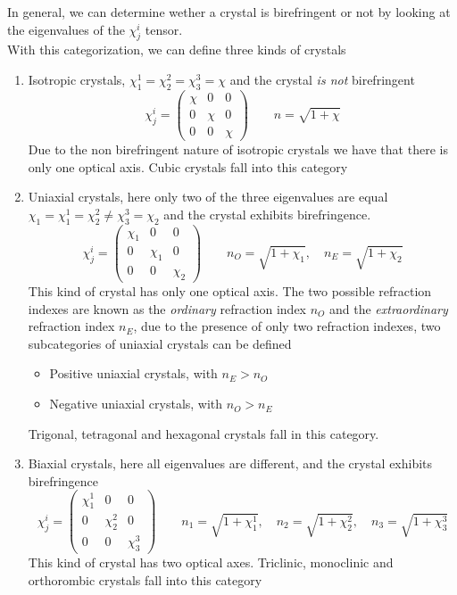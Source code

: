 \documentclass[../electromagnetism.tex]{subfiles}
\begin{document}
In general, we can determine wether a crystal is birefringent or not by looking at the eigenvalues of the $\chi^i_j$ tensor.\\
With this categorization, we can define three kinds of crystals
\begin{enumerate}
\item Isotropic crystals, $\chi^1_1=\chi^2_2=\chi^3_3=\chi$ and the crystal \textit{is not} birefringent
	\begin{equation}
		\chi^i_j=\begin{pmatrix}
			\chi&0&0\\
			0&\chi&0\\
			0&0&\chi
		\end{pmatrix}\qquad n=\sqrt{1+\chi}
		\label{eq:isotropic.cry}
	\end{equation}
	Due to the non birefringent nature of isotropic crystals we have that there is only one optical axis. Cubic crystals fall into this category
\item Uniaxial crystals, here only two of the three eigenvalues are equal $\chi_1=\chi^1_1=\chi^2_2\ne\chi^3_3=\chi_2$ and the crystal exhibits birefringence.
	\begin{equation}
		\chi^i_j=\begin{pmatrix}
			\chi_1&0&0\\
			0&\chi_1&0\\
			0&0&\chi_2
		\end{pmatrix}\qquad n_O=\sqrt{1+\chi_1}, \quad n_E=\sqrt{1+\chi_2}
		\label{eq:uniaxial.cry}
	\end{equation}
	This kind of crystal has only one optical axis. The two possible refraction indexes are known as the \textit{ordinary} refraction index $n_O$ and the \textit{extraordinary} refraction index $n_E$, due to the presence of only two refraction indexes, two subcategories of uniaxial crystals can be defined
	\begin{itemize}
	\item Positive uniaxial crystals, with $n_E>n_O$
	\item Negative uniaxial crystals, with $n_O>n_E$
	\end{itemize}
	Trigonal, tetragonal and hexagonal crystals fall in this category.
\item Biaxial crystals, here all eigenvalues are different, and the crystal exhibits birefringence
	\begin{equation}
		\chi^i_j=\begin{pmatrix}
			\chi_1^1&0&0\\
			0&\chi_2^2&0\\
			0&0&\chi_3^3
		\end{pmatrix}\qquad n_1=\sqrt{1+\chi_1^1}, \quad n_2=\sqrt{1+\chi_2^2}, \quad n_3=\sqrt{1+\chi^3_3}
		\label{eq:biaxial.cry}
	\end{equation}
	This kind of crystal has two optical axes. Triclinic, monoclinic and orthorombic crystals fall into this category
\end{enumerate}
\end{document}
